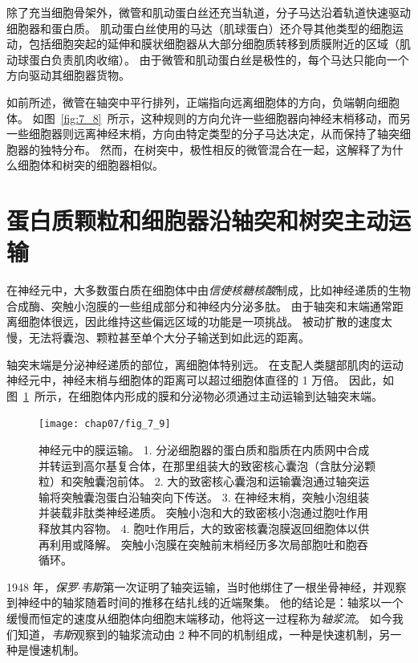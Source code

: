除了充当细胞骨架外，微管和肌动蛋白丝还充当轨道，分子马达沿着轨道快速驱动细胞器和蛋白质。
肌动蛋白丝使用的马达（肌球蛋白）还介导其他类型的细胞运动，包括细胞突起的延伸和膜状细胞器从大部分细胞质转移到质膜附近的区域（肌动球蛋白负责肌肉收缩）。
由于微管和肌动蛋白丝是极性的，每个马达只能向一个方向驱动其细胞器货物。


如前所述，微管在轴突中平行排列，正端指向远离细胞体的方向，负端朝向细胞体。
如图~\ref{fig:7_8}~所示，这种规则的方向允许一些细胞器向神经末梢移动，而另一些细胞器则远离神经末梢，方向由特定类型的分子马达决定，从而保持了轴突细胞器的独特分布。
然而，在树突中，极性相反的微管混合在一起，这解释了为什么细胞体和树突的细胞器相似。




\section{蛋白质颗粒和细胞器沿轴突和树突主动运输}

在神经元中，大多数蛋白质在细胞体中由\textit{信使核糖核酸}制成，比如神经递质的生物合成酶、突触小泡膜的一些组成部分和神经内分泌多肽。
由于轴突和末端通常距离细胞体很远，因此维持这些偏远区域的功能是一项挑战。
被动扩散的速度太慢，无法将囊泡、颗粒甚至单个大分子输送到如此远的距离。


轴突末端是分泌神经递质的部位，离细胞体特别远。
在支配人类腿部肌肉的运动神经元中，神经末梢与细胞体的距离可以超过细胞体直径的 1 万倍。
因此，如图~\ref{fig:7_9}~所示，在细胞体内形成的膜和分泌物必须通过主动运输到达轴突末端。


\begin{figure}[htbp]
	\centering
	\texttt{[image: chap07/fig\_7\_9]}
	\caption{神经元中的膜运输。
		1. 分泌细胞器的蛋白质和脂质在内质网中合成并转运到高尔基复合体，在那里组装大的致密核心囊泡（含肽分泌颗粒）和突触囊泡前体。
		2. 大的致密核心囊泡和运输囊泡通过轴突运输将突触囊泡蛋白沿轴突向下传送。
		3. 在神经末梢，突触小泡组装并装载非肽类神经递质。
		突触小泡和大的致密核小泡通过胞吐作用释放其内容物。
		4. 胞吐作用后，大的致密核囊泡膜返回细胞体以供再利用或降解。
		突触小泡膜在突触前末梢经历多次局部胞吐和胞吞循环。}
	\label{fig:7_9}
\end{figure}


1948 年，\textit{保罗$\cdot$韦斯}第一次证明了轴突运输，当时他绑住了一根坐骨神经，并观察到神经中的轴浆随着时间的推移在结扎线的近端聚集。
他的结论是：轴浆以一个缓慢而恒定的速度从细胞体向细胞末端移动，他将这一过程称为\textit{轴浆流}。
如今我们知道，\textit{韦斯}观察到的轴浆流动由 2 种不同的机制组成，一种是快速机制，另一种是慢速机制。


